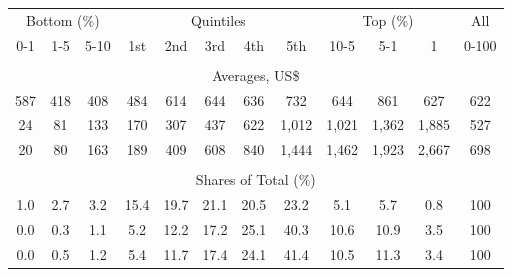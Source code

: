 \begin{tabular}{c c c| c c c c c| c c c| c}
\toprule
\multicolumn{3}{c|}{Bottom (\%)} & \multicolumn{5}{c|}{Quintiles} & \multicolumn{3}{c|}{Top (\%)} & All  \\
0-1 & 1-5 & 5-10 &  1st & 2nd & 3rd & 4th & 5th & 10-5 & 5-1 & 1 & 0-100 \\
\midrule \\
\multicolumn{12}{c}{Averages, US\$} \\
\midrule
587  & 418  & 408  & 484  & 614  & 644  & 636  & 732  & 644  & 861  & 627  & 622 \\
24 & 81 & 133 & 170 & 307 & 437 & 622 & 1,012 & 1,021 & 1,362 & 1,885 & 527 \\
20 & 80 & 163 & 189 & 409 & 608 & 840 & 1,444 & 1,462 & 1,923 & 2,667 & 698 \\
\midrule \\
\multicolumn{12}{c}{Shares of Total (\%)} \\
\midrule
1.0   & 2.7   & 3.2   & 15.4   & 19.7   & 21.1   & 20.5   & 23.2   & 5.1   & 5.7   & 0.8   & 100 \\
0.0  & 0.3  & 1.1  & 5.2  & 12.2  & 17.2  & 25.1  & 40.3  & 10.6  & 10.9  & 3.5  & 100 \\
0.0  & 0.5  & 1.2  & 5.4  & 11.7  & 17.4  & 24.1  & 41.4  & 10.5  & 11.3  & 3.4  & 100 \\
\bottomrule
\end{tabular}